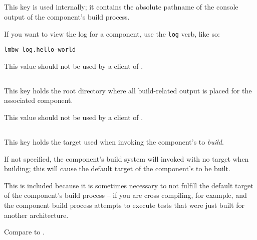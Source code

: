 \subsection{}\label{variables:build-log}

This key is used internally; it contains the absolute pathname of the
console output of the component's build process.

If you want to view the log for a component, use the \texttt{log}
verb, like so:

\begin{verbatim}
lmbw log.hello-world
\end{verbatim}

This value should not be used by a client of \lmsbw.


\subsection{}\label{variables:build-root-directory}

This key holds the root directory where all build-related output is
placed for the associated component.

This value should not be used by a client of \lmsbw.


\subsection{}\label{variables:build-target}

This key holds the target used when invoking the component's \makefile
to \emph{build}.

If not specified, the component's build system will invoked with no
target when building; this will cause the default target of the
component's \makefile to be built.

This is included because it is sometimes necessary to not fulfill the
default target of the component's build process -- if you are cross
compiling, for example, and the component build process attempts to
execute tests that were just built for another architecture.

Compare to .

\label{variables:build-target}

